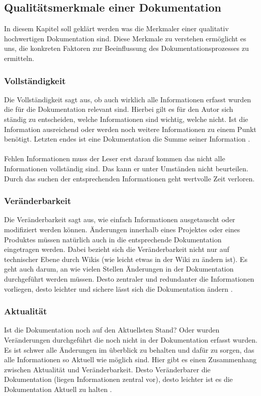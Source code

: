 \documentclass[a4paper,12pt]{scrartcl}
\begin{document}
\subsection{Qualitätsmerkmale einer Dokumentation}
In diesem Kapitel soll geklärt werden was die Merkmaler einer qualitativ hochwertigen Dokumentation sind. Diese Merkmale zu verstehen ermöglicht es uns, die konkreten Faktoren zur Beeinflussung des Dokumentationsprozesses zu ermitteln.
\subsubsection{Vollständigkeit}
Die Vollständigkeit sagt aus, ob auch wirklich alle Informationen erfasst wurden die für die Dokumentation relevant sind. Hierbei gilt es für den Autor sich ständig zu entscheiden, welche Informationen sind wichtig, welche nicht. Ist die Information ausreichend oder werden noch weitere Informationen zu einem Punkt benötigt. Letzten endes ist eine Dokumentation die Summe seiner Information \cite{Prause2013}.
\\\\
Fehlen Informationen muss der Leser erst darauf kommen das nicht alle Informationen vollständig sind. Das kann er unter Umständen nicht beurteilen. Durch das suchen der entsprechenden Informationen geht wertvolle Zeit verloren.

\subsubsection{Veränderbarkeit}
Die Veränderbarkeit sagt aus, wie einfach Informationen ausgetauscht oder modifiziert werden können. Änderungen innerhalb eines Projektes oder eines Produktes müssen natürlich auch in die entsprechende Dokumentation eingetragen werden. Dabei bezieht sich die Veränderbarkeit nicht nur auf technischer Ebene durch Wikis (wie leicht etwas in der Wiki zu ändern ist). Es geht auch darum, an wie vielen Stellen Änderungen in der Dokumentation durchgeführt werden müssen. Desto zentraler und redundanter die Informationen vorliegen, desto leichter und sichere lässt sich die Dokumentation ändern \cite{Prause2013}.

\subsubsection{Aktualität}
Ist die Dokumentation noch auf den Aktuellsten Stand? Oder wurden Veränderungen durchgeführt die noch nicht in der Dokumentation erfasst wurden. Es ist schwer alle Änderungen im überblick zu behalten und dafür zu sorgen, das alle Informationen so Aktuell wie möglich sind. Hier gibt es einen Zusammenhang zwischen Aktualität und Veränderbarkeit. Desto Veränderbarer die Dokumentation (liegen Informationen zentral vor), desto leichter ist es die Dokumentation Aktuell zu halten \cite{Prause2013}.
\end{document}
